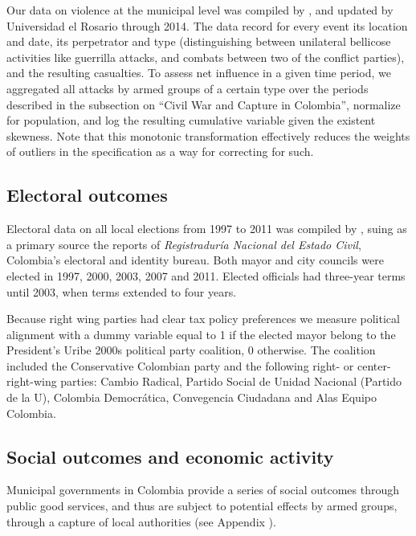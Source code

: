 Our data on violence at the municipal level was compiled by \citet{restrepoetal03}, and updated by Universidad el Rosario through 2014. The data record for every event its location and date, its perpetrator and type (distinguishing between unilateral bellicose activities like guerrilla attacks, and combats between two of the conflict parties), and the resulting casualties. To assess net influence in a given time period, we aggregated all attacks by armed groups of a certain type over the periods described in the subsection on ``Civil War and Capture in Colombia'', normalize for population, and log the resulting cumulative variable given the existent skewness. Note that this monotonic transformation effectively reduces the weights of outliers in the specification as a way for correcting for such.

\subsection{Electoral outcomes \label{appendix3:electoral_outcomes}}

Electoral data on all local elections from 1997 to 2011 was compiled by \citet{pachonsanchez14}, suing as a primary source the reports of {\it Registradur\'ia Nacional del Estado Civil}, Colombia's electoral and identity bureau. Both mayor and city councils were elected in 1997, 2000, 2003, 2007 and 2011. Elected officials had three-year terms until 2003, when terms extended to four years.

Because right wing parties had clear tax policy preferences we measure political alignment with a dummy variable equal to 1 if the elected mayor belong to the President's Uribe 2000s political party coalition, 0 otherwise. The coalition included the Conservative Colombian party and the following right- or center-right-wing parties: Cambio Radical, Partido Social de Unidad Nacional (Partido de la U), Colombia Democr\'atica, Convegencia Ciudadana and Alas Equipo Colombia.

\subsection{Social outcomes and economic activity \label{appendix3:social_outcomes}}

Municipal governments in Colombia provide a series of social outcomes through public good services, and thus are subject to potential effects by armed groups, through a capture of local authorities (see Appendix \label{appendix3:test_electoral_mechanism}). 

